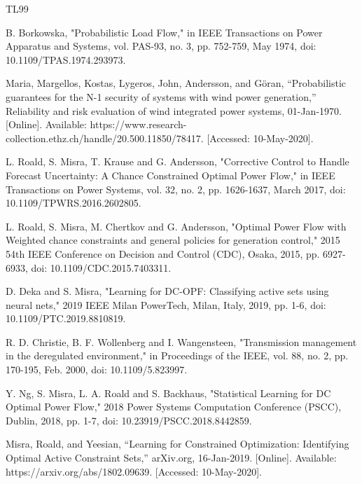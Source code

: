 \documentclass[11pt]{article}
\begin{document}
\begin{thebibliography} {TL99}

{\sc B. Borkowska,} 
"Probabilistic Load Flow," in IEEE Transactions on Power Apparatus and Systems, vol. PAS-93, no. 3, pp. 752-759, May 1974, doi: 10.1109/TPAS.1974.293973.

{\sc Maria, Margellos, Kostas, Lygeros, John, Andersson, and Göran,} 
“Probabilistic guarantees for the N-1 security of systems with wind power generation,” Reliability and risk evaluation of wind integrated power systems, 01-Jan-1970. [Online]. Available: https://www.research-collection.ethz.ch/handle/20.500.11850/78417. [Accessed: 10-May-2020].

{\sc L. Roald, S. Misra, T. Krause and G. Andersson,} 
"Corrective Control to Handle Forecast Uncertainty: A Chance Constrained Optimal Power Flow," in IEEE Transactions on Power Systems, vol. 32, no. 2, pp. 1626-1637, March 2017, doi: 10.1109/TPWRS.2016.2602805.

{\sc L. Roald, S. Misra, M. Chertkov and G. Andersson,} 
"Optimal Power Flow with Weighted chance constraints and general policies for generation control," 2015 54th IEEE Conference on Decision and Control (CDC), Osaka, 2015, pp. 6927-6933, doi: 10.1109/CDC.2015.7403311.

{\sc D. Deka and S. Misra,} 
"Learning for DC-OPF: Classifying active sets using neural nets," 2019 IEEE Milan PowerTech, Milan, Italy, 2019, pp. 1-6, doi: 10.1109/PTC.2019.8810819.

\bibitem{}
{\sc R. D. Christie, B. F. Wollenberg and I. Wangensteen,} 
"Transmission management in the deregulated environment," in Proceedings of the IEEE, vol. 88, no. 2, pp. 170-195, Feb. 2000, doi: 10.1109/5.823997.

{\sc Y. Ng, S. Misra, L. A. Roald and S. Backhaus,} 
"Statistical Learning for DC Optimal Power Flow," 2018 Power Systems Computation Conference (PSCC), Dublin, 2018, pp. 1-7, doi: 10.23919/PSCC.2018.8442859.

{\sc Misra, Roald, and Yeesian,} 
“Learning for Constrained Optimization: Identifying Optimal Active Constraint Sets,” arXiv.org, 16-Jan-2019. [Online]. Available: https://arxiv.org/abs/1802.09639. [Accessed: 10-May-2020].


\end{thebibliography}
\end{document}
